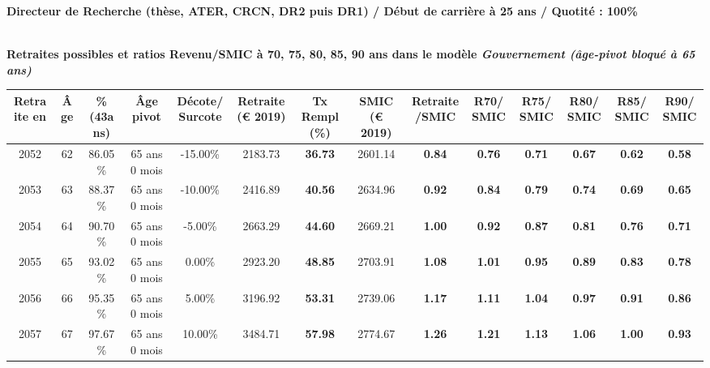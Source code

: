 {\bf \noindent Directeur de Recherche (thèse, ATER, CRCN, DR2 puis DR1) / Début de carrière à 25 ans / Quotité : 100\%}  ~ 

 ~\\{\bf \noindent Retraites possibles et ratios Revenu/SMIC à 70, 75, 80, 85, 90 ans dans le modèle \emph{Gouvernement (âge-pivot bloqué à 65 ans)}}  
 
\begin{adjustbox}{max width=\textwidth} 
\begin{tabular}[htb]{|c|c||c|c|c||c|c||c|c||c|c|c|c|c|} 
\hline 
 Retraite en &  Âge &  \%(43ans) &  Âge pivot &  Décote/Surcote &  Retraite (\euro{} 2019) &  Tx Rempl(\%) &  SMIC (\euro{} 2019) &  Retraite/SMIC &  R70/SMIC &  R75/SMIC &  R80/SMIC &  R85/SMIC &  R90/SMIC \\ 
\hline \hline 
 2052 &  62 &  86.05\% &  65 ans 0 mois &  -15.00\% &  2183.73 &  {\bf 36.73} &  2601.14 &  {\bf {\color{red} 0.84}} &  {\bf {\color{red} 0.76}} &  {\bf {\color{red} 0.71}} &  {\bf {\color{red} 0.67}} &  {\bf {\color{red} 0.62}} &  {\bf {\color{red} 0.58}} \\ 
\hline 
 2053 &  63 &  88.37\% &  65 ans 0 mois &  -10.00\% &  2416.89 &  {\bf 40.56} &  2634.96 &  {\bf {\color{red} 0.92}} &  {\bf {\color{red} 0.84}} &  {\bf {\color{red} 0.79}} &  {\bf {\color{red} 0.74}} &  {\bf {\color{red} 0.69}} &  {\bf {\color{red} 0.65}} \\ 
\hline 
 2054 &  64 &  90.70\% &  65 ans 0 mois &  -5.00\% &  2663.29 &  {\bf 44.60} &  2669.21 &  {\bf {\color{red} 1.00}} &  {\bf {\color{red} 0.92}} &  {\bf {\color{red} 0.87}} &  {\bf {\color{red} 0.81}} &  {\bf {\color{red} 0.76}} &  {\bf {\color{red} 0.71}} \\ 
\hline 
 2055 &  65 &  93.02\% &  65 ans 0 mois &  0.00\% &  2923.20 &  {\bf 48.85} &  2703.91 &  {\bf 1.08} &  {\bf 1.01} &  {\bf {\color{red} 0.95}} &  {\bf {\color{red} 0.89}} &  {\bf {\color{red} 0.83}} &  {\bf {\color{red} 0.78}} \\ 
\hline 
 2056 &  66 &  95.35\% &  65 ans 0 mois &  5.00\% &  3196.92 &  {\bf 53.31} &  2739.06 &  {\bf 1.17} &  {\bf 1.11} &  {\bf 1.04} &  {\bf {\color{red} 0.97}} &  {\bf {\color{red} 0.91}} &  {\bf {\color{red} 0.86}} \\ 
\hline 
 2057 &  67 &  97.67\% &  65 ans 0 mois &  10.00\% &  3484.71 &  {\bf 57.98} &  2774.67 &  {\bf 1.26} &  {\bf 1.21} &  {\bf 1.13} &  {\bf 1.06} &  {\bf {\color{red} 1.00}} &  {\bf {\color{red} 0.93}} \\ 
\hline 
\hline 
\end{tabular} 
\end{adjustbox} 
 
